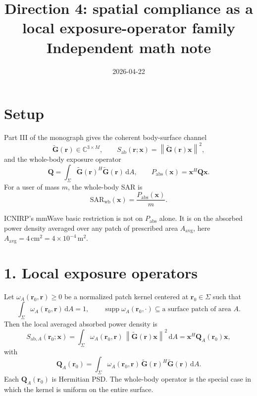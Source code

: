 \documentclass[11pt]{article}
\title{Direction 4: spatial compliance as a local exposure-operator family\\
\large Independent math note}
\author{}
\date{2026-04-22}
\newcommand{\rr}{\mathbf{r}}
\newcommand{\x}{\mathbf{x}}
\newcommand{\Q}{\mathbf{Q}}
\newcommand{\Gt}{\widetilde{\mathbf{G}}}
\newcommand{\Sigmaset}{\Sigma}
\newcommand{\Sab}{S_{\mathrm{ab}}}
\newcommand{\SARwb}{\mathrm{SAR}_{\mathrm{wb}}}
\newcommand{\diff}{\mathrm{d}}
\newcommand{\norm}[1]{\left\lVert #1 \right\rVert}
\begin{document}
\maketitle

\section*{Setup}

Part III of the monograph gives the coherent body-surface channel
\begin{equation}
  \Gt(\rr) \in \mathbb{C}^{3 \times M},
  \qquad
  \Sab(\rr;\x) = \norm{\Gt(\rr)\x}^2,
\end{equation}
and the whole-body exposure operator
\begin{equation}
  \Q
  = \int_{\Sigmaset} \Gt(\rr)^H \Gt(\rr)\,\diff A,
  \qquad
  P_{\mathrm{abs}}(\x) = \x^H \Q \x.
\end{equation}
For a user of mass $m$, the whole-body SAR is
\begin{equation}
  \SARwb(\x) = \frac{P_{\mathrm{abs}}(\x)}{m}.
\end{equation}

ICNIRP's mmWave basic restriction is not on $P_{\mathrm{abs}}$ alone. It is on
the absorbed power density averaged over any patch of prescribed area
$A_{\mathrm{avg}}$, here
$A_{\mathrm{avg}}=4\,\mathrm{cm}^2=4\times 10^{-4}\,\mathrm{m}^2$.

\section*{1. Local exposure operators}

Let $\omega_{A}(\rr_0,\rr) \ge 0$ be a normalized patch kernel centered at
$\rr_0 \in \Sigmaset$ such that
\begin{equation}
  \int_{\Sigmaset} \omega_A(\rr_0,\rr)\,\diff A = 1,
  \qquad
  \operatorname{supp}\omega_A(\rr_0,\cdot)
  \subseteq \text{a surface patch of area } A.
\end{equation}
Then the local averaged absorbed power density is
\begin{equation}
  S_{\mathrm{ab},A}(\rr_0;\x)
  = \int_{\Sigmaset} \omega_A(\rr_0,\rr)\,
    \norm{\Gt(\rr)\x}^2\,\diff A
  = \x^H \Q_A(\rr_0)\x,
\end{equation}
with
\begin{equation}
  \Q_A(\rr_0)
  = \int_{\Sigmaset} \omega_A(\rr_0,\rr)\,
    \Gt(\rr)^H \Gt(\rr)\,\diff A.
\end{equation}
Each $\Q_A(\rr_0)$ is Hermitian PSD. The whole-body operator is the special
case in which the kernel is uniform on the entire surface.
\end{document}

